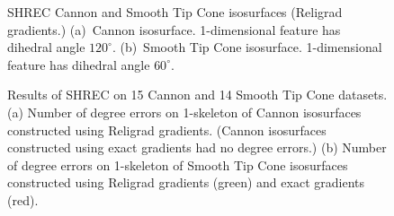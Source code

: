 \begin{figure}[t]
\caption{SHREC Cannon and Smooth Tip Cone isosurfaces (Religrad gradients.) 
(a)~Cannon isosurface.
\mbox{1-dimensional} feature has dihedral angle $120^\circ$.
(b)~Smooth Tip Cone isosurface.  1-dimensional feature has dihedral angle $60^\circ$.}
\label{fig:cannon_cone}
\end{figure}

\begin{figure}[t]

\caption{Results of SHREC on 15 Cannon and 14 Smooth Tip Cone datasets.
(a) Number of degree errors on 1-skeleton of Cannon isosurfaces
constructed using Religrad gradients.
(Cannon isosurfaces constructed using exact gradients had no degree errors.)
(b) Number of degree errors on 1-skeleton of Smooth Tip Cone isosurfaces
constructed using Religrad gradients (green) and exact gradients (red).}
\label{fig:cannon_cone_summary}
\end{figure}

